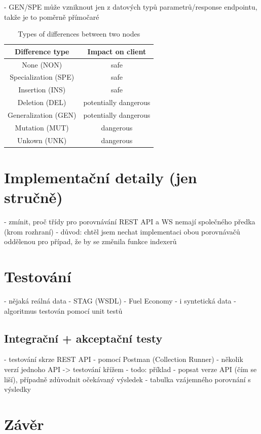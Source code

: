 \documentclass[czech,DP]{thesiskiv}
\begin{document}
	- GEN/SPE může vzniknout jen z datových typů parametrů/response endpointu, takže je to poměrně přímočaré

\begin{table}[h!]
	\centering
	\begin{tabular}{c|c}
		Difference type & Impact on client  \\
		\hline
		None (NON) & safe \\
		Specialization (SPE) & safe  \\
		Insertion (INS) & safe \\
		Deletion (DEL) & potentially dangerous \\
		Generalization (GEN) & potentially dangerous \\
		Mutation (MUT) & dangerous \\
		Unkown (UNK) & dangerous
	\end{tabular}
	\caption{Types of differences between two nodes }
	\label{tab:diff-level}
\end{table}

\chapter{Implementační detaily (jen stručně)}

 - zmínit, proč třídy pro porovnávání REST API a WS nemají společného předka (krom rozhraní)
 	- důvod: chtěl jsem nechat implementaci obou porovnávačů oddělenou pro případ, že by se změnila funkce indexerů

\chapter{Testování}

- nějaká reálná data
	- STAG (WSDL)
	- Fuel Economy
- i syntetická data
- algoritmus testován pomocí unit testů

\section{Integrační + akceptační testy}

- testování skrze REST API
- pomocí Postman (Collection Runner)
- několik verzí jednoho API -> testování křížem
- todo: příklad
	- popsat verze API (čím se liší), případně zdůvodnit očekávaný výsledek
	- tabulka vzájemného porovnání s výsledky

\chapter{Závěr}	

 
% 
%

{\raggedright\small

}
\end{document}
